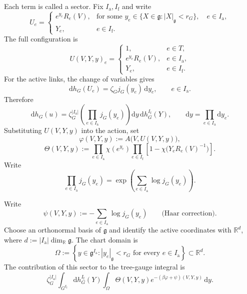 \documentclass[10pt,reqno]{amsart}
\theoremstyle{definition}
\theoremstyle{remark}
\numberwithin{equation}{section}
\numberwithin{figure}{section}
\newcommand{\g}{\mathfrak g}
\newcommand{\dd}{\mathrm d}
\newcommand{\R}{\mathbb R}
\newcommand{\Ia}{I_{\mathrm a}}
\newcommand{\If}{I_{\mathrm f}}
\begin{document}
Each term is called a sector. Fix $\Ia,\If$ and write
\begin{equation}\label{eq:display-089}
U_e=
\begin{cases}
e^{y_e}R_e(V),&\text{for some }y_e\in\{X\in\g:|X|_\g<r_G\},\quad e\in\Ia,\\
Y_e,&e\in\If.
\end{cases}
\end{equation}
The full configuration is
\begin{equation}\label{eq:display-090}
U(V,Y,y)_e=
\begin{cases}
1,&e\in T,\\
e^{y_e}R_e(V),&e\in\Ia,\\
Y_e,&e\in\If.
\end{cases}
\end{equation}
For the active links, the change of variables gives
\begin{equation}\label{eq:display-091}
\dd h_G(U_e)=\zeta_Gj_G(y_e)\,\dd y_e,\qquad e\in\Ia.
\end{equation}
Therefore
\begin{equation}\label{eq:display-092}
\dd h_G(u)=\zeta_G^{|\Ia|}
\left(\prod_{e\in\Ia}j_G(y_e)\right)\dd y\,\dd h_G^{\If}(Y),
\qquad\dd y=\prod_{e\in\Ia}\dd y_e.
\end{equation}
Substituting $U(V,Y,y)$ into the action, set
\begin{equation}\label{eq:sector-action}
\varphi(V,Y,y):=A\bigl(V,U(V,Y,y)\bigr),
\end{equation}
\begin{equation}\label{eq:sector-cutoff}
\Theta(V,Y,y):=
\prod_{e\in\Ia}\chi(e^{y_e})
\prod_{e\in\If}\left[1-\chi\bigl(Y_eR_e(V)^{-1}\bigr)\right].
\end{equation}
Write
\begin{equation}\label{eq:display-095}
\prod_{e\in\Ia}j_G(y_e)
=\exp\left(\sum_{e\in\Ia}\log j_G(y_e)\right).
\end{equation}

Write
\begin{equation}\label{eq:haar-correction}
\psi(V,Y,y):=-\sum_{e\in\Ia}\log j_G(y_e)
\qquad\text{(Haar correction)}.
\end{equation}
Choose an orthonormal basis of $\g$ and identify the active coordinates with $\R^d$, where $d:=|\Ia|\dim_{\R}\g$. The chart domain is
\begin{equation}\label{eq:chart-domain}
\boxed{
\Omega:=\left\{y\in\g^{\Ia}:|y_e|_{\g}<r_G
\text{ for every }e\in\Ia\right\}\subset\R^d.
}
\end{equation}
The contribution of this sector to the tree-gauge integral is
\begin{equation}\label{eq:display-098}
\zeta_G^{|\Ia|}\int_{G^{\If}}\dd h_G^{\If}(Y)
\int_{\Omega}\Theta(V,Y,y)e^{-(\beta\varphi+\psi)(V,Y,y)}\,\dd y.
\end{equation}
\end{document}
